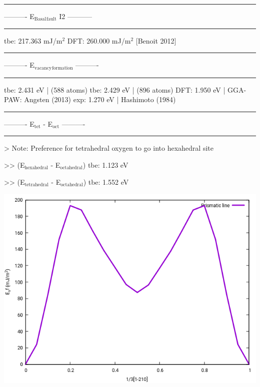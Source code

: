 \documentclass[11pt]{article}
\begin{document}
\noindent\rule{\textwidth}{0.5pt}
----------     E\(_{\text{Basal}}\)\(_{\text{fault}}\) I2     -----------

\noindent\rule{\textwidth}{0.5pt}

tbe:       217.363 mJ/m\(^{\text{2}}\)
DFT:       260.000 mJ/m\(^{\text{2}}\) [Benoit  2012]


\noindent\rule{\textwidth}{0.5pt}
----------    E\(_{\text{vacancy}}\)\(_{\text{formation}}\)    ----------

\noindent\rule{\textwidth}{0.5pt}

tbe:      2.431 eV  | (588 atoms)
tbe:      2.429 eV  | (896 atoms)
DFT:      1.950 eV  |  GGA-PAW: Angsten (2013) 
exp:      1.270 eV  |  Hashimoto (1984)

\noindent\rule{\textwidth}{0.5pt}
----------     E\(_{\text{tet}}\) - E\(_{\text{oct}}\)     ----------

\noindent\rule{\textwidth}{0.5pt}

> Note: Preference for tetrahedral oxygen to go into hexahedral site

>> (E\(_{\text{hexahedral}}\) - E\(_{\text{octahedral}}\))
   tbe:      1.123 eV

>> (E\(_{\text{tetrahedral}}\) - E\(_{\text{octahedral}}\)) 
   tbe:      1.552 eV

\begin{center}
\includegraphics[width=.9\linewidth]{Images/prismatic_gamma_line_2019-11-04_omega_ord_model.png}
\end{center}
\end{document}
